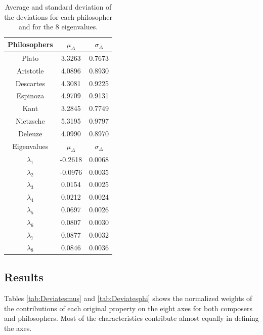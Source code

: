 \documentclass[
 aip,
 jmp,
 amsmath,amssymb,
 reprint,
]{revtex4-1}
\begin{document}
\begin{table}%
\caption{\label{tab:tableDphi}Average and standard deviation of the 
deviations for each philosopher and for the 8 eigenvalues.  }

\begin{tabular}{|c||c|c|}
\hline

Philosophers & $\mu_{\Delta}$ & $\sigma_{\Delta}$ \\
\hline
Plato          & 3.3263 & 0.7673 \\
Aristotle      & 4.0896 & 0.8930 \\
Descartes      & 4.3081 & 0.9225 \\
Espinoza       & 4.9709 & 0.9131 \\
Kant           & 3.2845 & 0.7749 \\
Nietzsche      & 5.3195 & 0.9797 \\
Deleuze        & 4.0990 & 0.8970 \\
\hline \hline
Eigenvalues & $\mu_{\Delta}$ & $\sigma_{\Delta}$ \\
\hline
$\lambda_1$ & -0.2618 & 0.0068 \\
$\lambda_2$ & -0.0976 & 0.0035 \\
$\lambda_3$ &  0.0154 & 0.0025 \\
$\lambda_4$ &  0.0212 & 0.0024 \\
$\lambda_5$ &  0.0697 & 0.0026 \\
$\lambda_6$ &  0.0807 & 0.0030 \\
$\lambda_7$ &  0.0877 & 0.0032 \\
$\lambda_8$ &  0.0846 & 0.0036 \\
\hline

\end{tabular}
\end{table}


\subsection{Results}

Tables \ref{tab:Deviatesmus} and \ref{tab:Deviatesphi} shows the normalized weights of the contributions of each original property on the eight
axes for both composers and philosophers. Most of the characteristics contribute almost equally in defining the axes. 
\end{document}
